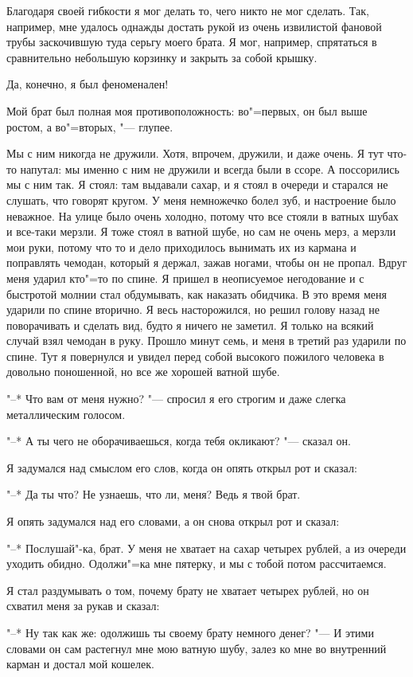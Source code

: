 Благодаря своей гибкости я мог делать то, чего никто не мог сделать. Так, например, мне удалось однажды достать рукой из очень извилистой фановой  трубы заскочившую туда серьгу моего брата. Я мог, например, спрятаться в сравнительно небольшую корзинку и закрыть за собой крышку.

Да, конечно, я был феноменален!

Мой брат был полная моя противоположность: во"=первых, он был выше ростом, а во"=вторых, "--- глупее.

Мы с ним никогда не дружили. Хотя, впрочем, дружили, и даже очень. Я тут что-то напутал: мы именно с ним не дружили и всегда были в ссоре. А поссорились мы с ним так. Я стоял: там выдавали сахар, и я стоял в очереди и старался не слушать, что говорят кругом. У меня немножечко болел зуб, и настроение было неважное. На  улице было очень холодно, потому что все стояли в ватных шубах и все-таки мерзли. Я тоже стоял в ватной шубе, но сам не очень мерз, а мерзли мои руки, потому что то и дело приходилось вынимать их из кармана и поправлять чемодан, который я держал, зажав ногами, чтобы он не пропал. Вдруг меня ударил кто"=то по спине. Я пришел в неописуемое негодование и с быстротой молнии стал обдумывать, как наказать обидчика. В это время меня ударили по спине вторично. Я весь насторожился, но решил голову назад не поворачивать и сделать вид, будто я ничего не  заметил. Я только на всякий случай взял чемодан в руку. Прошло минут семь, и меня в третий раз ударили по спине. Тут я повернулся и увидел перед собой высокого пожилого человека в довольно поношенной, но все же хорошей ватной шубе.

"--* Что вам от  меня  нужно?  "---  спросил я его строгим и даже слегка металлическим голосом.
    
"--* А ты чего не оборачиваешься, когда тебя окликают? "--- сказал он.

Я задумался над смыслом его слов, когда он опять открыл рот и сказал:

"--* Да  ты что?  Не узнаешь, что ли, меня? Ведь я твой брат.

Я опять задумался над его словами,  а он снова открыл рот и сказал:

"--* Послушай"-ка,  брат. У меня не хватает на сахар четырех рублей, а из очереди уходить обидно. Одолжи"=ка мне пятерку, и мы с тобой потом рассчитаемся.

Я стал раздумывать о том, почему брату не хватает четырех рублей, но он схватил меня за рукав и сказал:

"--* Ну так как же: одолжишь ты своему брату немного денег? "--- И этими словами он сам растегнул мне мою ватную шубу, залез ко мне во внутренний  карман и достал мой кошелек.

